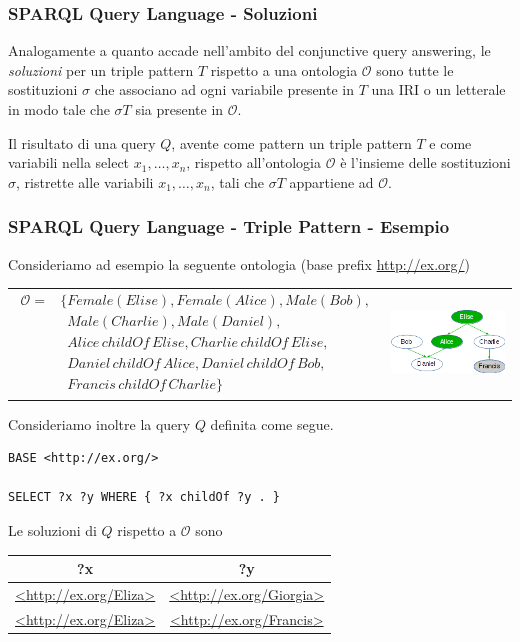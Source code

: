 \documentclass[8pt]{beamer}
\newcommand{\Ont}{\mathcal{O}}
\begin{document}
\begin{frame}[fragile]
\frametitle{SPARQL Query Language - Soluzioni}
Analogamente a quanto accade nell'ambito del conjunctive query answering,
le \emph{soluzioni} per un triple pattern $T$ rispetto a una ontologia $\Ont$ 
sono tutte le sostituzioni $\sigma$ che associano ad ogni variabile presente 
in $T$ una IRI o un letterale in modo tale che $\sigma T$ sia presente in $\Ont$.
\vspace{\baselineskip}

Il risultato di una query $Q$, avente come pattern un triple pattern $T$
e come variabili nella select $x_1, \ldots, x_n$,
rispetto all'ontologia $\Ont$ \`e l'insieme delle sostituzioni $\sigma$,
ristrette alle variabili $x_1, \ldots, x_n$, tali che
$\sigma T$ appartiene ad $\Ont$.
\end{frame}

\begin{frame}[fragile]
 \frametitle{SPARQL Query Language - Triple Pattern - Esempio}
 Consideriamo ad esempio la seguente ontologia (base prefix \url{http://ex.org/})
\begin{tabular}{cc}
$\begin{array}{cl}
  \Ont  =  &  \{Female(Elise), Female(Alice), Male(Bob), \\
  &\phantom{\{}Male(Charlie), Male(Daniel), \\
  &\phantom{\{}Alice\,childOf\,Elise, Charlie\,childOf\,Elise, \\
  &\phantom{\{}Daniel\,childOf\,Alice, Daniel\,childOf\,Bob, \\
  &\phantom{\{}Francis\,childOf\,Charlie \}
 \end{array}$ & \includegraphics[width=120px]{family.png} \\
\end{tabular}

Consideriamo inoltre la query $Q$ definita come segue.

\begin{Verbatim}[fontsize=\small]
BASE <http://ex.org/>

SELECT ?x ?y WHERE { ?x childOf ?y . }
\end{Verbatim}

Le soluzioni di $Q$ rispetto a $\Ont$ sono
\begin{tabular}{|c|c|}
\hline 
?x & ?y \\
\hline
\url{<http://ex.org/Eliza>} & \url{<http://ex.org/Giorgia>} \\
\url{<http://ex.org/Eliza>} & \url{<http://ex.org/Francis>} \\
\hline 
\end{tabular}
\end{frame}
\end{document}
